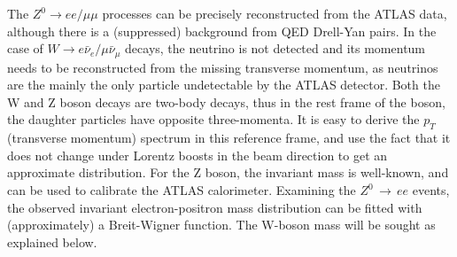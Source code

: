 \documentclass[twocolumn]{article}
\begin{document}
The $Z^0 \rightarrow ee/\mu\mu$ processes can be precisely reconstructed from the ATLAS data, although there is a (suppressed) background from QED Drell-Yan pairs. In the case of $W \rightarrow e \bar{\nu}_e/\mu \bar{\nu}_\mu$ decays, the neutrino is not detected and its momentum needs to be reconstructed from the missing transverse momentum, as neutrinos are the mainly the only particle undetectable by the ATLAS detector. Both the W and Z boson decays are two-body decays, thus in the rest frame of the boson, the daughter particles have opposite three-momenta. It is easy to derive the $p_T$ (transverse momentum) spectrum in this reference frame, and use the fact that it does not change under Lorentz boosts in the beam direction to get an approximate distribution. For the Z boson, the invariant mass is well-known, and can be used to calibrate the ATLAS calorimeter. Examining the $Z^0 \, \rightarrow \, ee$ events, the observed invariant electron-positron mass distribution can be fitted with (approximately) a Breit-Wigner function. The W-boson mass will be sought as explained below. %
\end{document}
